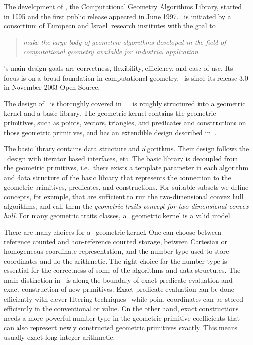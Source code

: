 The development of \cgal, the Computational Geometry Algorithms
Library, started in 1995 and the first public release appeared in June
1997. \cgal\ is initiated by a consortium of European and Israeli research
institutes with the goal to
\begin{quote}
    {\em make the large body of geometric algorithms developed in the field
    of computational geometry available for industrial application.}
\end{quote}
\cgal's main design goals are correctness, flexibility, efficiency,
and ease of use. Its focus is on a broad foundation in computational
geometry. \cgal\ is since its release 3.0 in November 2003 Open Source. 

The design of \cgal\ is thoroughly covered
in~\cite{fgkss-dccga-00,bksv-agppd-00}. 
\cgal\ is roughly structured into a geometric kernel and a basic
library. The geometric kernel contains the geometric primitives, such
as points, vectors, triangles, and predicates and constructions on
those geometric primitives, and has an extendible design described
in~\cite{hhkps-aegk-01}.

The basic library contains data structure and
algorithms.  Their design follows the \stl\ design with iterator based
interfaces, etc. The basic library is decoupled from the geometric
primitives, i.e., there exists a template parameter in each
algorithm and data structure of the basic library that represents the
connection to the geometric primitives, predicates, and constructions.
For suitable subsets we define concepts, for example,
that are sufficient to run the two-dimensional convex hull algorithms,
and call them the \emph{geometric traits concept for two-dimensional
convex hull}. For many geometric traits classes, a \cgal\ geometric
kernel is a valid model.

There are many choices for a \cgal\ geometric kernel. One can choose
between reference counted and non-reference counted storage, between
Cartesian or homogeneous coordinate
representation,%
and the number type used to store coordinates and do the
arithmetic. The right choice for the number type is essential for the
correctness of some of the algorithms and data structures. The main
distinction in \cgal\ is along the boundary of exact predicate
evaluation and exact construction of new primitives. Exact predicate
evaluation can be done efficiently with clever filtering
techniques~\cite{bbp-iayed-01} while point coordinates can be stored
efficiently in the conventional  or 
value. On the other hand, exact constructions needs a more powerful
number type in the geometric primitive coefficients that can also
represent newly constructed geometric primitives exactly. This means
usually exact long integer arithmetic. 

